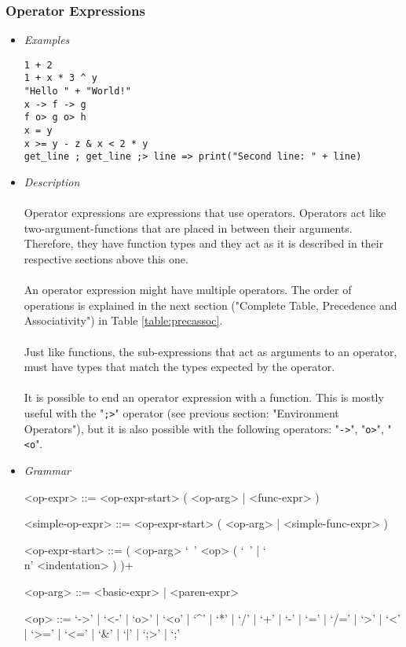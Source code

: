 \documentclass{article}
\begin{document}
\subsubsection{Operator Expressions}

\begin{itemize}
\item \textit{Examples}
\begin{verbatim}
1 + 2
1 + x * 3 ^ y
"Hello " + "World!"
x -> f -> g
f o> g o> h
x = y
x >= y - z & x < 2 * y
get_line ; get_line ;> line => print("Second line: " + line)
\end{verbatim}

\item \textit{Description}\\\\
Operator expressions are expressions that use operators. Operators act like
two-argument-functions that are placed in between their arguments. Therefore,
they have function types and they act as it is described in their respective
sections above this one.
\\\\
An operator expression might have multiple operators. The order of operations
is explained in the next section ("Complete Table, Precedence and Associativity")
in Table \ref{table:precassoc}.
\\\\
Just like functions, the sub-expressions
that act as arguments to an operator, must have types that match the types 
expected by the operator.
\\\\
It is possible to end an operator expression with a function. This is mostly
useful with the "\texttt{;>}" operator (see previous section: "Environment
Operators"), but it is also possible with the following operators:
"\texttt{->}", "\texttt{o>}", "\texttt{<o}".

\item \textit{Grammar}
\begin{grammar}
<op-expr> ::=
<op-expr-start> ( <op-arg> | <func-expr> )

<simple-op-expr> ::=  <op-expr-start> ( <op-arg> | <simple-func-expr> )

<op-expr-start> ::= ( <op-arg> `\ ' <op> ( `\ ' | `\\n' <indentation> ) )+

<op-arg> ::= <basic-expr> | <paren-expr>

<op> ::= 
`->' | `<-' | `o>' | `<o' | `^' | `*' | `/' | `+' | `-' |
`=' | `/=' | `>' | `<' | `>=' | `<=' | `\&' | `|' | `;>' | `;'\\

\end{grammar}
\end{itemize}
\end{document}
